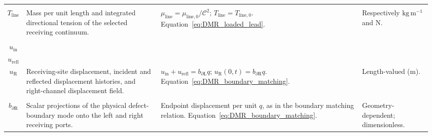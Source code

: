 \begin{longtable}{@{} c p{5.5cm} p{4cm} p{3.5cm} @{}}
\begin{tabular}[c]{@{}c@{}}$\mu_{\mathrm{line}}$ \\ $T_{\mathrm{line}}$\end{tabular} & {\raggedright Mass per unit length and integrated directional tension of the selected receiving continuum.\par} & {\raggedright $\mu_{\mathrm{line}}=\mu_{\mathrm{line},0}/\mathcal C^2$; $T_{\mathrm{line}}=T_{\mathrm{line},0}$. \newline Equation~\eqref{eq:DMR_loaded_lead}.\par} & {\raggedright Respectively $\mathrm{kg\,m^{-1}}$ and $\mathrm N$.\par} \\

\begin{tabular}[c]{@{}c@{}}$u_n$ \\ $u_{\mathrm{in}}$ \\ $u_{\mathrm{refl}}$ \\ $u_{\mathrm R}$\end{tabular} & {\raggedright Receiving-site displacement, incident and reflected displacement histories, and right-channel displacement field.\par} & {\raggedright $u_{\mathrm{in}}+u_{\mathrm{refl}}=b_{\partial\mathrm L}q$; $u_{\mathrm R}(0,t)=b_{\partial\mathrm R}q$. \newline Equation~\eqref{eq:DMR_boundary_matching}.\par} & {\raggedright Length-valued ($\mathrm m$).\par} \\

\begin{tabular}[c]{@{}c@{}}$b_{\partial\mathrm L}$ \\ $b_{\partial\mathrm R}$\end{tabular} & {\raggedright Scalar projections of the physical defect-boundary mode onto the left and right receiving ports.\par} & {\raggedright Endpoint displacement per unit $q$, as in the boundary matching relation. \newline Equation~\eqref{eq:DMR_boundary_matching}.\par} & {\raggedright Geometry-dependent; dimensionless.\par} \\


\end{longtable}

